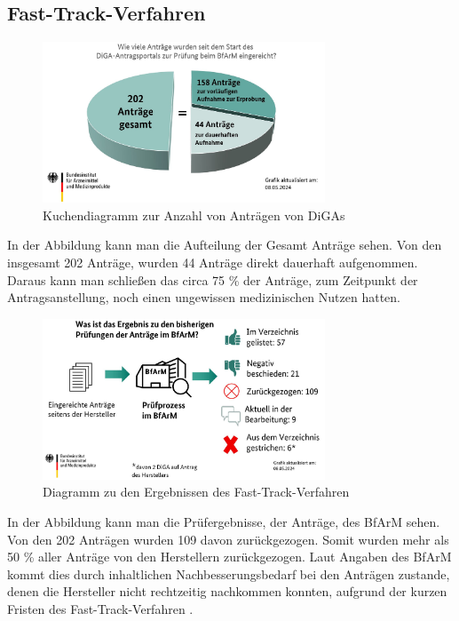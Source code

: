 \documentclass{article}
\begin{document}
		\subsection{Fast-Track-Verfahren} 
			\begin{figure}[htbp]
				\centering
				\includegraphics[width=0.75\textwidth]{./grafiken/Anzahl_Antraege_DiGA}
				\caption[Anzahl Anträge von DiGAs]{Kuchendiagramm zur Anzahl von Anträgen von DiGAs}
				\label{Abb-antragsanzahl-diga}
			\end{figure}
			In der Abbildung kann man die Aufteilung der Gesamt Anträge sehen. Von den insgesamt 202 Anträge, wurden 44 Anträge direkt dauerhaft aufgenommen. Daraus kann man schließen das circa 75 \% der Anträge, zum Zeitpunkt der Antragsanstellung, noch einen ungewissen medizinischen Nutzen hatten.
		
			\begin{figure}[htbp]
				\centering
				\includegraphics[width=0.75\textwidth]{./grafiken/Ergebnis_Pruefungen_DiGA}
				\caption[Abbildung zu den Ergebnissen des Fast-Track-Verfahren]{Diagramm zu den Ergebnissen des Fast-Track-Verfahren}
				\label{Abb-ergebnisse-ft}
			\end{figure} 
			In der Abbildung kann man die Prüfergebnisse, der Anträge, des BfArM sehen. Von den 202 Anträgen wurden 109 davon zurückgezogen. Somit wurden mehr als 50 \% aller Anträge von den Herstellern zurückgezogen. Laut Angaben des BfArM kommt dies durch inhaltlichen Nachbesserungsbedarf bei den Anträgen zustande, denen die Hersteller nicht rechtzeitig nachkommen konnten, aufgrund der kurzen Fristen des Fast-Track-Verfahren \cite[vgl. Z. 37]{tipps-diga-antragsansteller}. 
			
\end{document}
